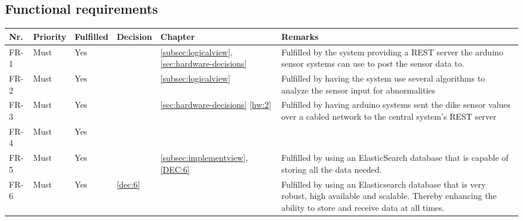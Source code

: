 \subsection{Functional requirements}
\begin{table}[H]
	\begin{tabular}{lllllL{0.5\textwidth}}
						    
		Nr.   & Priority & Fulfilled & Decision & Chapter & Remarks \\ \hline
		
		FR-1  & Must     & Yes        & &\ref{subsec:logicalview}, \ref{sec:hardware-decisions} & Fulfilled by the system providing a REST server the arduino sensor systems can use to post the sensor data to. \\ 
		
		FR-2  & Must     & Yes       & &\ref{subsec:logicalview}       & Fulfilled by having the system use several algorithms to analyze the sensor input for abnormalities \\ 
		FR-3  & Must     & Yes        & &\ref{sec:hardware-decisions} \ref{hw:2}         & Fulfilled by having arduino systems sent the dike sensor values over a cabled network to the central system's REST server \\ 
		
		FR-4  & Must     & Yes        &          & ~       \\ 
		
		FR-5  & Must     & Yes        & &\ref{subsec:implementview},\ref{DEC:6} & Fulfilled by using an ElasticSearch database that is capable of storing all the data needed.       \\ 
		
		FR-6  & Must     & Yes & \ref{dec:6} & &Fulfilled by using an Elasticsearch database that is very robust, high available and scalable. Thereby enhancing the ability to store and receive data at all times. \\
		

\end{tabular}
\end{table}
